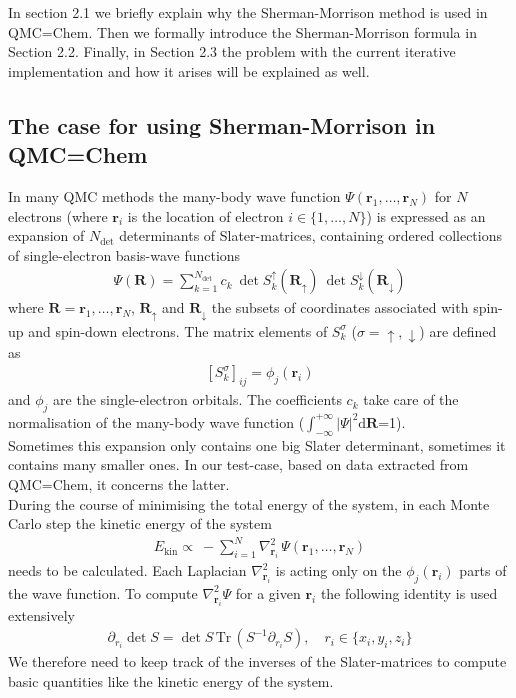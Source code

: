 \documentclass[11pt]{article}
\numberwithin{figure}{section}
\numberwithin{table}{section}
\begin{document}
        In section 2.1 we briefly explain why the Sherman-Morrison method is used in QMC=Chem. Then we formally introduce the Sherman-Morrison formula in Section 2.2. Finally, in Section 2.3 the problem with the current iterative implementation and how it arises will be explained as well.
	
		\subsection{The case for using Sherman-Morrison in QMC=Chem}
			In many QMC methods the many-body wave function $\Psi(\mathbf{r}_1,\ldots,\mathbf{r}_N)$ for $N$ electrons (where $\mathbf{r}_i$ is the location of electron $i\in\{1,\ldots ,N\}$) is expressed as an expansion of $N_\mathrm{det}$ determinants of Slater-matrices, containing ordered collections of single-electron basis-wave functions
			\begin{align}\label{eqn:mbwf}
				\Psi(\mathbf{R}) = \sum_{k=1}^{N_\mathrm{det}}c_k\:\det S_k^\uparrow(\mathbf{R}_\uparrow)\:\det S_k^\downarrow(\mathbf{R}_\downarrow)
			\end{align}
			where $\mathbf{R}=\mathbf{r}_1,\ldots,\mathbf{r}_N$, $\mathbf{R}_\uparrow$ and $\mathbf{R}_\downarrow$ the subsets of coordinates associated with spin-up and spin-down electrons. The matrix elements of $S_k^\sigma$ ($\sigma=\uparrow,\downarrow$) are defined as 
			\begin{align}
				\left[S_k^\sigma\right]_{ij} = \phi_j(\mathbf{r}_i)
			\end{align}
			and $\phi_j$ are the single-electron orbitals. The coefficients $c_k$ take care of the normalisation of the many-body wave function ($\int_{-\infty}^{+\infty}|\Psi|^2\mathrm{d}\mathbf{R}$=1).\\
			
			Sometimes this expansion only contains one big Slater determinant, sometimes it contains many smaller ones. In our test-case, based on data extracted from QMC=Chem, it concerns the latter.\\
				
			During the course of minimising the total energy of the system, in each Monte Carlo step the kinetic energy of the system
			\begin{align}
				E_\mathrm{kin} \propto\:-\!\sum_{i=1}^{N}\nabla^2_{\mathbf{r}_i}\,\Psi(\mathbf{r}_1,\ldots,\mathbf{r}_N)
			\end{align}
			needs to be calculated. Each Laplacian $\nabla^2_{\mathbf{r}_i}$ is acting only on the $\phi_j(\mathbf{r}_i)$ parts of the wave function. To compute $\nabla^2_{\mathbf{r}_i}\Psi$ for a given $\mathbf{r}_i$ the following identity is used extensively
			\begin{align}
				\partial_{r_i}\det S=\det S\,\mathrm{Tr}\,(S^{-1}\partial_{r_i} S),\quad r_i\in\{x_i,y_i,z_i\}
			\end{align}
			We therefore need to keep track of the inverses of the Slater-matrices to compute basic quantities like the kinetic energy of the system.\\
			
\end{document}
